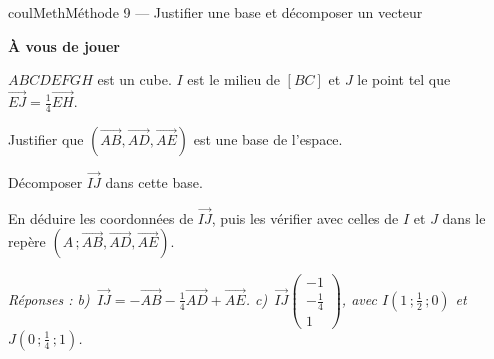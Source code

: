 \documentclass[11pt,a4paper]{article}
\makeatletter
\newcommand{\vect}[1]{\overrightarrow{#1}}
\newcounter{lycee@signet}
\newcommand{\signet}[3][]{\stepcounter{lycee@signet}%
  \edef\lycee@dest{\if\relax\detokenize{#1}\relax
    signet.\arabic{lycee@signet}\else#1\fi}%
  \hypertarget{\lycee@dest}{}\bookmark[level=#2,dest=\lycee@dest]{#3}}
\newcounter{methode}
\newenvironment{methodebox}[1][Méthode]{\stepcounter{methode}%
  \begin{boitecours}[phantom={\signet[methode-\arabic{methode}]{2}{#1}}]{coulMeth}{#1}}%
  {\end{boitecours}}
\newcommand{\etape}[1]{\par\smallskip\textbf{\color{coulMeth}#1}\par\nobreak\smallskip}
\newcommand{\reponse}[1]{\par\smallskip
  {\footnotesize\itshape\color{black!55}Réponses : #1}}
\makeatother
\begin{document}
\begin{methodebox}[Méthode 9 --- Justifier une base et décomposer un vecteur]
\etape{À vous de jouer}
$ABCDEFGH$ est un cube. $I$ est le milieu de $[BC]$ et $J$ le point tel que
$\vect{EJ}=\frac{1}{4}\vect{EH}$.
\begin{questions}[label=\alph*)]
  \item Justifier que $(\vect{AB},\vect{AD},\vect{AE})$ est une base de l'espace.
  \item Décomposer $\vect{IJ}$ dans cette base.
  \item En déduire les coordonnées de $\vect{IJ}$, puis les vérifier avec celles de
        $I$ et $J$ dans le repère $(A\,;\vect{AB},\vect{AD},\vect{AE})$.
\end{questions}
\reponse{b)~$\vect{IJ}=-\vect{AB}-\frac{1}{4}\vect{AD}+\vect{AE}$.\;
c)~$\vect{IJ}\begin{pmatrix}-1\\-\frac{1}{4}\\1\end{pmatrix}$, avec $I(1\,;\frac{1}{2}\,;0)$ et $J(0\,;\frac{1}{4}\,;1)$.}
\end{methodebox}
\end{document}
